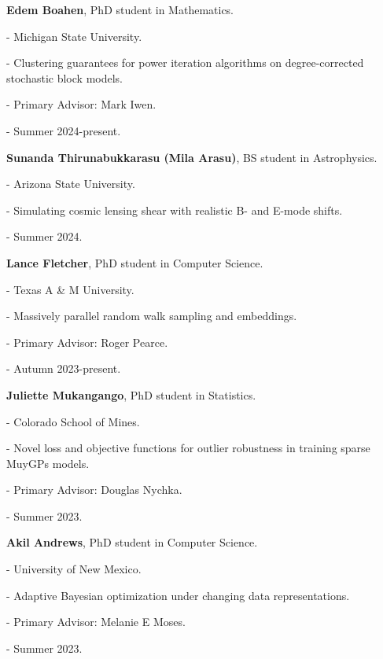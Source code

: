 \begin{innerlist}

  \item[] \textbf{Edem Boahen},
  PhD student in Mathematics.
  \begin{innerlist}
    \item[-] Michigan State University.
    \item[-] Clustering guarantees for power iteration algorithms on degree-corrected
      stochastic block models.
    \item[-] Primary Advisor: Mark Iwen.
    \item[-] Summer 2024-present.
  \end{innerlist}
  
  \item[] \textbf{Sunanda Thirunabukkarasu (Mila Arasu)},
  BS student in Astrophysics.
  \begin{innerlist}
    \item[-] Arizona State University.
    \item[-] Simulating cosmic lensing shear with realistic B- and E-mode shifts.
    \item[-] Summer 2024.
  \end{innerlist}

  \item[] \textbf{Lance Fletcher},
  PhD student in Computer Science.
  \begin{innerlist}
    \item[-] Texas A \& M University.
    \item[-] Massively parallel random walk sampling and embeddings.
    \item[-] Primary Advisor: Roger Pearce.
    \item[-] Autumn 2023-present.
  \end{innerlist}

  \item[] \textbf{Juliette Mukangango},
  PhD student in Statistics.
  \begin{innerlist}
    \item[-] Colorado School of Mines.
    \item[-] Novel loss and objective functions for outlier robustness in training sparse MuyGPs models.
    \item[-] Primary Advisor: Douglas Nychka.
    \item[-] Summer 2023.
  \end{innerlist}

  \item[] \textbf{Akil Andrews},
  PhD student in Computer Science.
  \begin{innerlist}
    \item[-] University of New Mexico.
    \item[-] Adaptive Bayesian optimization under changing data representations.
    \item[-] Primary Advisor: Melanie E Moses.
    \item[-] Summer 2023.
  \end{innerlist}


\end{innerlist}
